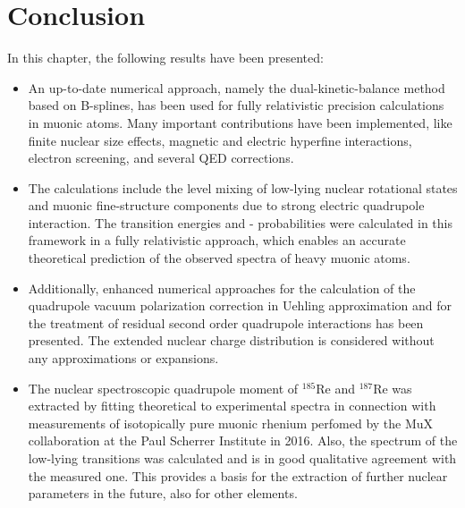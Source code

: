 \section{Conclusion}
\label{sec:muon_summary}
In this chapter, the following results have been presented:\\
\begin{itemize}
\setlength{\itemsep}{0.75cm}
\item An up-to-date numerical approach, namely the dual-kinetic-balance method based on B-splines, has been used for fully relativistic precision calculations in muonic atoms. Many important contributions have been implemented, like finite nuclear size effects, magnetic and electric hyperfine interactions, electron screening, and several QED corrections. 

\item The calculations include the level mixing of low-lying nuclear rotational states and muonic fine-structure components due to strong electric quadrupole interaction. The transition energies and - probabilities were calculated in this framework in a fully relativistic approach, which enables an accurate theoretical prediction of the observed spectra of heavy muonic atoms.
\item Additionally, enhanced numerical approaches for the calculation of the quadrupole vacuum polarization correction in Uehling approximation and for the treatment of residual second order quadrupole interactions has been presented. The extended nuclear charge distribution is considered without any approximations or expansions.
\item The nuclear spectroscopic quadrupole moment of $^{185}$Re and $^{187}$Re was extracted by fitting theoretical to experimental spectra in connection with measurements of isotopically pure muonic rhenium perfomed by the MuX collaboration at the Paul Scherrer Institute in 2016. Also, the spectrum of the low-lying transitions was calculated and is in good qualitative agreement with the measured one. This provides a basis for the extraction of further nuclear parameters in the future, also for other elements.
\end{itemize}
